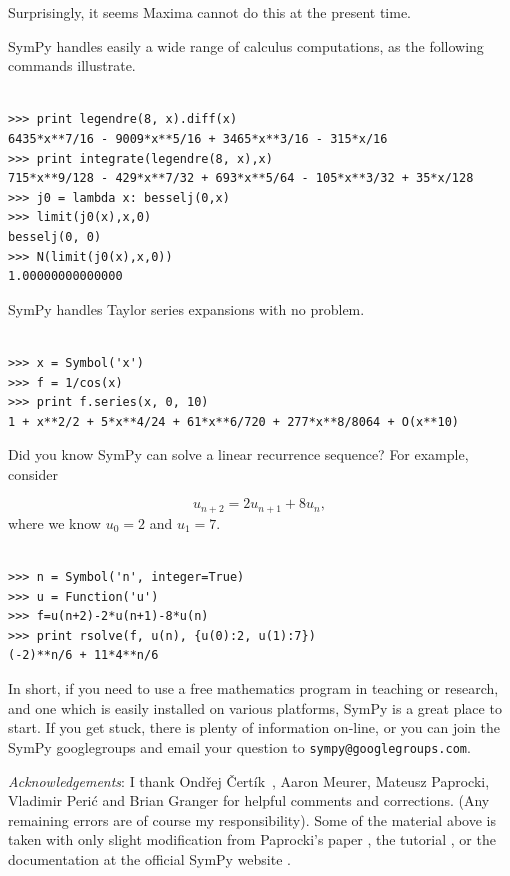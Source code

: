 \documentclass[12pt]{article}
\def\OC{Ond\v rej \v Cert\' ik\ }
\begin{document}
\noindent
Surprisingly, it seems Maxima cannot do this at the present time.

SymPy handles easily a wide range of calculus computations, as the following 
commands illustrate.

\begin{Verbatim}[fontsize=\scriptsize,fontfamily=courier,fontshape=tt,frame=single,label=SymPy]

>>> print legendre(8, x).diff(x)
6435*x**7/16 - 9009*x**5/16 + 3465*x**3/16 - 315*x/16
>>> print integrate(legendre(8, x),x)
715*x**9/128 - 429*x**7/32 + 693*x**5/64 - 105*x**3/32 + 35*x/128
>>> j0 = lambda x: besselj(0,x)
>>> limit(j0(x),x,0)
besselj(0, 0)
>>> N(limit(j0(x),x,0))
1.00000000000000

\end{Verbatim}

SymPy handles Taylor series expansions with no problem.

\begin{Verbatim}[fontsize=\scriptsize,fontfamily=courier,fontshape=tt,frame=single,label=SymPy]

>>> x = Symbol('x')
>>> f = 1/cos(x)
>>> print f.series(x, 0, 10)
1 + x**2/2 + 5*x**4/24 + 61*x**6/720 + 277*x**8/8064 + O(x**10)

\end{Verbatim}

Did you know SymPy can solve a linear recurrence sequence?
For example, consider

\[
 u_{n+2} = 2  u_{n+1} + 8  u_{n}, 
\]
where we know $u_{0} = 2$ and $u_{1} = 7$.

\begin{Verbatim}[fontsize=\scriptsize,fontfamily=courier,fontshape=tt,frame=single,label=SymPy]

>>> n = Symbol('n', integer=True)
>>> u = Function('u')
>>> f=u(n+2)-2*u(n+1)-8*u(n)
>>> print rsolve(f, u(n), {u(0):2, u(1):7})
(-2)**n/6 + 11*4**n/6

\end{Verbatim}


\vskip 0.3in

In short, if you need to use a free mathematics program in teaching or
research, and one which is easily installed on various platforms,
SymPy is a great place to start. If you get stuck, there is plenty of
information
on-line, or you can join the SymPy googlegroups and
email your question to {\tt sympy@googlegroups.com}.

\vskip 0.3in

\noindent
{\it Acknowledgements}:
I thank \OC, Aaron Meurer, Mateusz Paprocki, Vladimir Peri\'c and Brian Granger  
for helpful comments and corrections. (Any remaining errors are of course my
responsibility). Some of the material above is taken 
with only slight modification from Paprocki's paper
\cite{P}, the tutorial \cite{PM}, or the documentation at the official SymPy website
\cite{S}.
\end{document}
